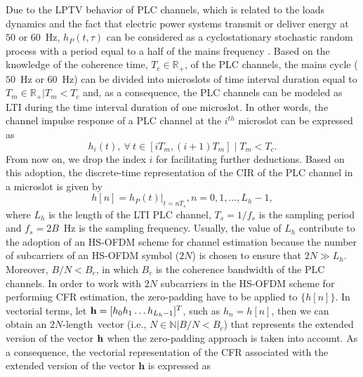 Due to the \ac{LPTV} behavior of \ac{PLC} channels, which is related to the loads dynamics and the fact that electric power systems transmit or deliver energy at $50$ or $60$~Hz, $h_P(t,\tau)$ can be considered as a cyclostationary stochastic random process with a period equal to a half of the mains frequency \cite{Colen:TCRA}. Based on the knowledge of the coherence time, $T_c \in \mathbb{R}_+$, of the \ac{PLC} channels, the mains cycle ($50$~Hz or $60$~Hz) can be divided into microslots of time interval duration equal to $T_m\in \mathbb{R}_+|T_m < T_c$ and, as a consequence, the \ac{PLC} channels can be modeled as \ac{LTI} during the time interval duration of one microslot. In other words, the channel impulse response of a \ac{PLC} channel at the $i^{th}$ microslot can be expressed as
\begin{equation} \label{discreteh}
h_{i}(t),~\forall~t \in [iT_{m}, (i+1)T_{m}] \mid T_{m} < T_{c}.
\end{equation}
From now on, we drop the index $i$ for facilitating further deductions. Based on this adoption, the discrete-time representation of the \ac{CIR} of the \ac{PLC} channel in a microslot is given by
\begin{equation} \label{discreteCFR}
h[n] = h_P(t)|_{t=nT_s} , n = 0,1, \ldots, L_h-1, 
\end{equation}
where $L_{h}$ is the length of the \ac{LTI} \ac{PLC} channel, $T_s=1/f_s$ is the sampling period and $f_s=2B$~Hz is the sampling frequency. Usually, the value of $L_{h}$ contribute to the adoption of an \ac{HS-OFDM} scheme for channel estimation because the number of subcarriers of an \ac{HS-OFDM} symbol ($2N$) is chosen to ensure that $2N \gg L_h$. Moreover, $B/N < B_c$, in which $B_c$ is the coherence bandwidth of the \ac{PLC} channels. In order to work with $2N$ subcarriers in the \ac{HS-OFDM} scheme for performing \ac{CFR} estimation, the zero-padding have to be applied to $\{h[n]\}$. In vectorial terms, let ${\bf h}=[h_0 h_1 \ldots h_{L_h-1}]^T$, such as $h_n=h[n]$, then we can obtain an $2N\text{-length}$~vector (i.e., $N\in \mathbb{N}|B/N<B_c$) that represents the extended version of the vector ${\bf h}$ when the zero-padding approach is taken into account. As a consequence, the vectorial representation of the \ac{CFR} associated with the extended version of the vector $\mathbf{h}$ is expressed as

